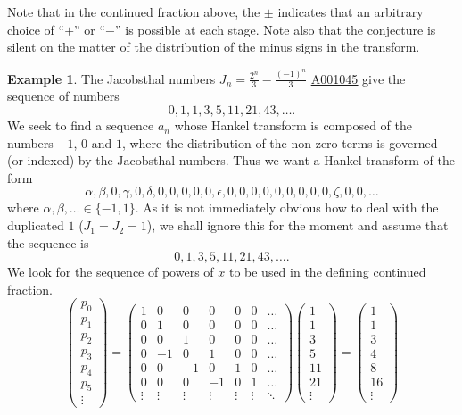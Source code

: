 \documentclass[12pt,reqno]{article}
\theoremstyle{definition}
\newtheorem{example}[theorem]{Example}
\newcommand{\seqnum}[1]{\href{http://oeis.org/#1}{\underline{#1}}}
\begin{document}
Note that in the continued fraction above, the $\pm$ indicates that an arbitrary choice of ``$+$'' or ``$-$'' is possible at each stage. Note also that the conjecture is silent on the matter of the distribution of the minus signs in the transform. 

\begin{example} The Jacobsthal numbers $J_n=\frac{2^n}{3}-\frac{(-1)^n}{3}$ \seqnum{A001045} give the sequence of numbers
$$0,1,1,3,5,11,21,43,\ldots.$$ We seek to find a sequence $a_n$ whose Hankel transform is composed of the numbers $-1$, $0$ and $1$, where the distribution of the non-zero terms is governed (or indexed) by the Jacobsthal numbers. Thus we want a Hankel transform of the form
$$\alpha,\beta,0,\gamma,0,\delta,0,0,0,0,0,\epsilon,0,0,0,0,0,0,0,0,0,\zeta,0,0,\ldots$$ where $\alpha, \beta,\ldots \in \{-1,1\}$.
As it is not immediately obvious how to deal with the duplicated $1$ ($J_1=J_2=1$), we shall ignore this for the moment and assume that the sequence is $$0,1,3,5,11,21,43,\ldots.$$
We look for the sequence of powers of $x$ to be used in the defining continued fraction.
\begin{displaymath}\left(\begin{array}{c} p_0 \\ p_1 \\p_2\\ p_3 \\p_4 \\p_5 \\ \vdots \end{array}\right)=
\left(\begin{array}{ccccccc}1 & 0 & 0 & 0 & 0 & 0 & \ldots \\
                            0 & 1 & 0 & 0 & 0 & 0 & \ldots \\
                            0 & 0 & 1 & 0& 0 & 0 & \ldots \\
                            0 & -1 & 0 & 1 & 0 & 0 & \ldots \\
                            0 & 0 & -1&  0 & 1 & 0 & \ldots \\
                            0 & 0  & 0 & -1 & 0 & 1 &\ldots\\ \vdots
& \vdots &
\vdots & \vdots & \vdots & \vdots &
\ddots\end{array}\right)\left(\begin{array}{c} 1 \\ 1 \\3\\ 5 \\11 \\21 \\ \vdots \end{array}\right)=
\left(\begin{array}{c} 1 \\ 1 \\3\\ 4 \\8 \\16 \\ \vdots \end{array}\right)\end{displaymath}


\end{example}
\end{document}
